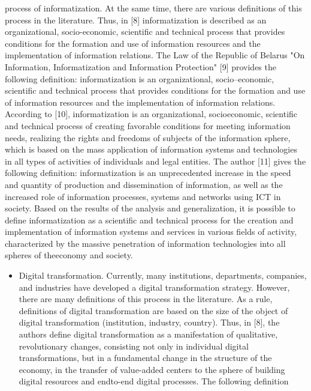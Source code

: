 \documentclass{article}
\begin{document}
\begin{multicols}{2}
\begin{itemize}
process of informatization. At the same time, there
are various definitions of this process in the literature. Thus, in [8] informatization is described
as an organizational, socio-economic, scientific and
technical process that provides conditions for the
formation and use of information resources and
the implementation of information relations. The
Law of the Republic of Belarus "On Information,
Informatization and Information Protection" [9] provides the following definition: informatization is
an organizational, socio–economic, scientific and
technical process that provides conditions for the
formation and use of information resources and the
implementation of information relations. According
to [10], informatization is an organizational, socioeconomic, scientific and technical process of creating favorable conditions for meeting information
needs, realizing the rights and freedoms of subjects of the information sphere, which is based on
the mass application of information systems and
technologies in all types of activities of individuals
and legal entities. The author [11] gives the following definition: informatization is an unprecedented
increase in the speed and quantity of production
and dissemination of information, as well as the
increased role of information processes, systems and
networks using ICT in society. Based on the results
of the analysis and generalization, it is possible to
define informatization as a scientific and technical
process for the creation and implementation of
information systems and services in various fields
of activity, characterized by the massive penetration
of information technologies into all spheres of theeconomy and society.
\end{itemize}
\vspace{-24pt}
\begin{itemize}
\item Digital transformation. Currently, many institutions,
departments, companies, and industries have developed a digital transformation strategy. However,
there are many definitions of this process in the
literature. As a rule, definitions of digital transformation are based on the size of the object of digital
transformation (institution, industry, country). Thus,
in [8], the authors define digital transformation as a
manifestation of qualitative, revolutionary changes,
consisting not only in individual digital transformations, but in a fundamental change in the structure of
the economy, in the transfer of value-added centers
to the sphere of building digital resources and endto-end digital processes. The following definition

\end{itemize}
\end{multicols}
\end{document}
